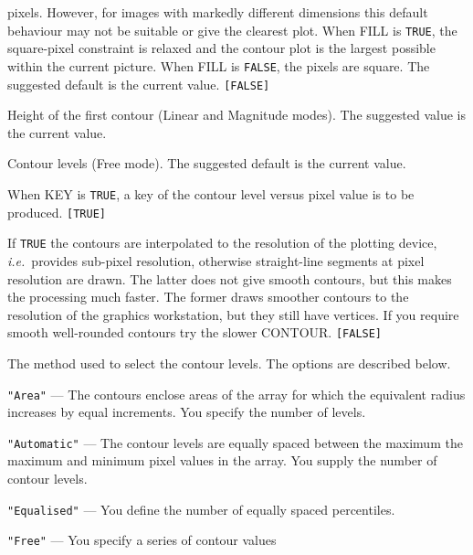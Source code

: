 \documentclass[twoside,11pt]{article}
\newcommand{\sstsubsection}[1]{ \item[{#1}] \mbox{} \\}
\renewcommand{\sstsubsection}[1]{\item[{#1}]}
\begin{document}
{{{         pixels.  However, for images with markedly different
         dimensions this default behaviour may not be suitable or give
         the clearest plot.  When FILL is {\tt TRUE}, the square-pixel
         constraint is relaxed and the contour plot is the largest
         possible within the current picture.  When FILL is {\tt FALSE}, the
         pixels are square.  The suggested default is the current
         value.  {\tt [FALSE]}
      }
      \sstsubsection{
         FIRSTCNT = \_REAL (Read)
      }{
         Height of the first contour (Linear and Magnitude modes).
         The suggested value is the current value.
      }
      \sstsubsection{
         HEIGHTS() = \_REAL (Read)
      }{
         Contour levels (Free mode).  The suggested default is the
         current value.
      }
      \sstsubsection{
         KEY = \_LOGICAL (Read)
      }{
         When KEY is {\tt TRUE}, a key of the contour level versus
         pixel value is to be produced. {\tt [TRUE]}
      }
      \sstsubsection{
         MAXRES = \_LOGICAL (Read)
      }{
         If {\tt TRUE} the contours are interpolated to the resolution of the
         plotting device, {\it i.e.}\ provides sub-pixel resolution, otherwise
         straight-line segments at pixel resolution are drawn.  The
         latter does not give smooth contours, but this makes the
         processing much faster.  The former draws smoother contours to
         the resolution of the graphics workstation, but they still
         have vertices.  If you require smooth well-rounded contours try
         the slower CONTOUR. {\tt [FALSE]}
      }
      \sstsubsection{
         MODE = LITERAL (Read)
      }{
         The method used to select the contour levels.  The options are
         described below.
         \begin{description}
         \item {\tt "Area"} --- The contours enclose areas of the array for
                         which the equivalent radius increases by equal
                         increments.  You specify the number of levels.
         \item {\tt "Automatic"} --- The contour levels are equally spaced between the maximum
                        the maximum and minimum pixel values in the
                        array.  You supply the number of contour levels.
         \item {\tt "Equalised"} --- You define the number of equally spaced
                          percentiles.
         \item {\tt "Free"} --- You specify a series of contour values

\end{description}}}}
\end{document}
